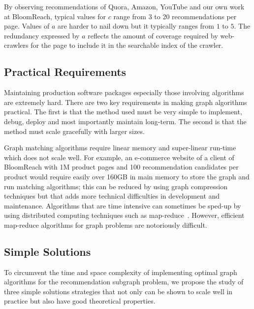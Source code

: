 By observing recommendations of Quora, Amazon, YouTube and our own
work at BloomReach, typical values for $c$ range from 3 to 20
recommendations per page. Values of $a$ are harder to nail down but it
typically ranges from $1$ to $5$. The redundancy expressed by $a$
reflects the amount of coverage required by web-crawlers for the page
to include it in the searchable index of the crawler. \vs

\subsection{Practical Requirements}

Maintaining production software packages especially those involving algorithms
are extremely hard. There are two key requirements in making graph algorithms
practical. The first is that the method used must be very simple to
implement, debug, deploy and most importantly maintain long-term. The second is that the method must scale
gracefully with larger sizes. \vs

Graph matching algorithms require linear memory and super-linear run-time
which does not scale well. For example, an e-commerce website of a
client of BloomReach with 1M product pages and 100 recommendation
candidates per product would require easily over 160GB in main memory to store the graph
and run matching algorithms; this can be reduced by using graph
compression techniques but that adds more technical difficulties in
development and maintenance. Algorithms that are time intensive
can sometimes be sped-up by using distributed computing techniques such as
map-reduce~\cite{DeanGhemawat2004}. However, efficient map-reduce
algorithms for graph problems are notoriously difficult. \vs

\subsection{Simple Solutions}

To circumvent the time and space complexity of implementing optimal
graph algorithms for the recommendation subgraph problem, we propose
the study of three simple solutions strategies that not only can be
shown to scale well in practice but also have good theoretical
properties.

